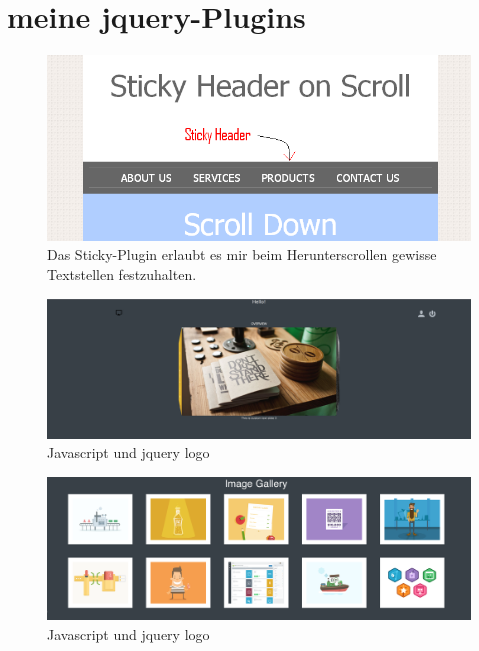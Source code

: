 \documentclass{article}
\begin{document}
\section{meine jquery-Plugins}

\begin{figure}[ht]
    \centering
    \includegraphics[width=.6\linewidth]{sticky}
    \caption{Das Sticky-Plugin erlaubt es mir beim Herunterscrollen gewisse Textstellen festzuhalten.}
    \label{fig:sub1}
    \end{figure}

    \begin{figure}[ht]
        \centering
        \includegraphics[width=.6\linewidth]{carousel}
        \caption{Javascript und jquery logo}
        \label{fig:sub1}
        \end{figure}

        \begin{figure}[ht]
            \centering
            \includegraphics[width=.6\linewidth]{gallery}
            \caption{Javascript und jquery logo}
            \label{fig:sub1}
            \end{figure}
\end{document}
